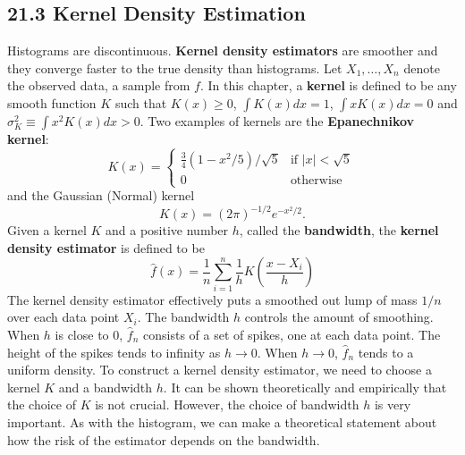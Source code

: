 \subsection*{21.3 Kernel Density Estimation}\label{kernel-density-estimation}
Histograms are discontinuous. \textbf{Kernel density estimators} are smoother and they converge faster to the true density than histograms.
Let \(X_{1}, \dots, X_{n}\) denote the observed data, a sample from \(f\). In this chapter, a \textbf{kernel} is defined to be any smooth function \(K\) such that \(K(x) \geq 0\), \(\int K(x) dx = 1\), \(\int x K(x) dx = 0\) and \(\sigma_K^{2} \equiv \int x^{2} K(x) dx > 0\). Two examples of kernels are the \textbf{Epanechnikov kernel}:
\[
K(x) = \begin{cases}
\frac{3}{4} \left(1 - x^{2} / 5 \right) / \sqrt{5} & \text{if } |x| < \sqrt{5} \\
0 & \text{otherwise}
\end{cases}
\]
and the Gaussian (Normal) kernel 
\[
K(x) = (2\pi)^{-1/2} e^{-x^{2}/2}.
\]
Given a kernel \(K\) and a positive number \(h\), called the \textbf{bandwidth}, the \textbf{kernel density estimator} is defined to be
\[
\hat{f}(x) = \frac{1}{n} \sum_{i=1}^{n} \frac{1}{h} K \left( \frac{x - X_{i}}{h} \right)
\]
The kernel density estimator effectively puts a smoothed out lump of mass \(1 / n\) over each data point \(X_{i}\). The bandwidth \(h\) controls the amount of smoothing. When \(h\) is close to 0, \(\hat{f}_{n}\) consists of a set of spikes, one at each data point. The height of the spikes tends to infinity as \(h \rightarrow 0\). When \(h \rightarrow 0\), \(\hat{f}_{n}\) tends to a uniform density.
To construct a kernel density estimator, we need to choose a kernel \(K\) and a bandwidth \(h\). It can be shown theoretically and empirically that the choice of \(K\) is not crucial. However, the choice of bandwidth \(h\) is very important. As with the histogram, we can make a theoretical statement about how the risk of the estimator depends on the bandwidth.


